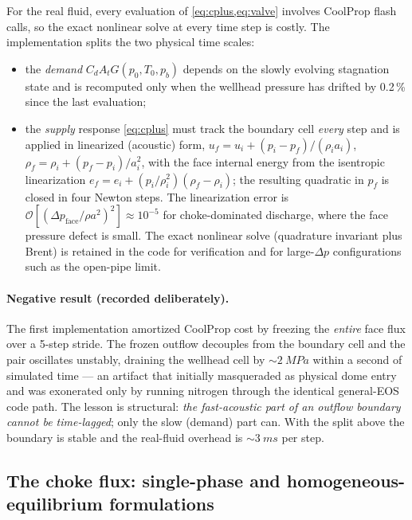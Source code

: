 \documentclass[11pt]{article}
\begin{document}
For the real fluid, every evaluation of \cref{eq:cplus,eq:valve}
involves CoolProp flash calls, so the exact nonlinear solve at every
time step is costly. The implementation splits the two physical time
scales:
\begin{itemize}
\item the \emph{demand} $C_d A_t G(p_0, T_0, p_b)$ depends on the
slowly evolving stagnation state and is recomputed only when the
wellhead pressure has drifted by 0.2\,\% since the last evaluation;
\item the \emph{supply} response \cref{eq:cplus} must track the
boundary cell \emph{every} step and is applied in linearized
(acoustic) form,
$u_f = u_i + (p_i - p_f)/(\rho_i a_i)$,
$\rho_f = \rho_i + (p_f - p_i)/a_i^2$, with the face internal energy
from the isentropic linearization
$e_f = e_i + (p_i/\rho_i^2)(\rho_f - \rho_i)$; the resulting quadratic
in $p_f$ is closed in four Newton steps. The linearization error is
$\mathcal{O}\!\left[(\Delta p_{\mathrm{face}}/\rho a^2)^2\right]
\approx 10^{-5}$ for choke-dominated discharge, where the face
pressure defect is small. The exact nonlinear solve (quadrature
invariant plus Brent) is retained in the code for verification and
for large-$\Delta p$ configurations such as the open-pipe limit.
\end{itemize}

\paragraph{Negative result (recorded deliberately).} The first
implementation amortized CoolProp cost by freezing the \emph{entire}
face flux over a 5-step stride. The frozen outflow decouples from the
boundary cell and the pair oscillates unstably, draining the wellhead
cell by ${\sim}\SI{2}{MPa}$ within a second of simulated time --- an
artifact that initially masqueraded as physical dome entry and was
exonerated only by running nitrogen through the identical general-EOS
code path. The lesson is structural: \emph{the fast-acoustic part of an
outflow boundary cannot be time-lagged}; only the slow (demand) part
can. With the split above the boundary is stable and the real-fluid
overhead is ${\sim}\SI{3}{ms}$ per step.

\subsection{The choke flux: single-phase and homogeneous-equilibrium
formulations}
\label{sec:hem}
\end{document}
